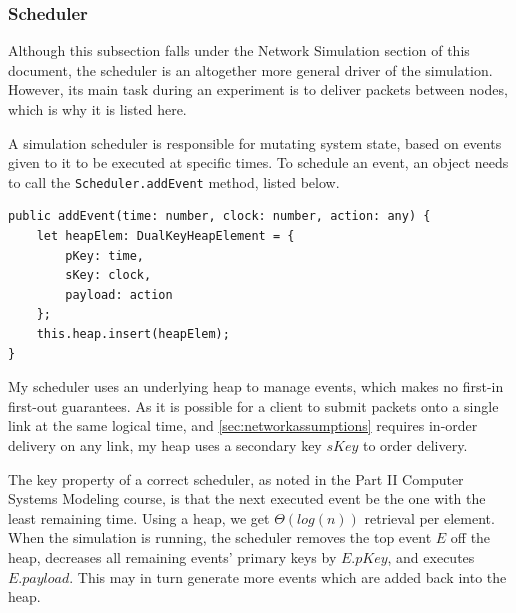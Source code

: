 \documentclass[12pt,a4paper,twoside,openright]{report}
\begin{document}
		
		\subsubsection{Scheduler}
		Although this subsection falls under the Network Simulation section of this document, the scheduler is an altogether more general driver of the simulation. However, its main task during an experiment is to deliver packets between nodes, which is why it is listed here.
		
		A simulation scheduler is responsible for mutating system state, based on events given to it to be executed at specific times. To schedule an event, an object needs to call the \lstinline|Scheduler.addEvent| method, listed below.
\begin{lstlisting}[caption=The Scheduler.addEvent method]
public addEvent(time: number, clock: number, action: any) {
    let heapElem: DualKeyHeapElement = {
        pKey: time,
        sKey: clock,
        payload: action
    };
    this.heap.insert(heapElem);
}
\end{lstlisting}

		My scheduler uses an underlying heap to manage events, which makes no first-in first-out guarantees. As it is possible for a client to submit packets onto a single link at the same logical time, and \cref{sec:networkassumptions} requires in-order delivery on any link, my heap uses a secondary key $sKey$ to order delivery.
		
		The key property of a correct scheduler, as noted in the Part II Computer Systems Modeling \cite[slide 120]{compsysmodeling} course, is that the next executed event be the one with the least remaining time. Using a heap, we get $\Theta (log(n))$ retrieval per element. When the simulation is running, the scheduler removes the top event $E$ off the heap, decreases all remaining events' primary keys by $E.pKey$, and executes $E.payload$. This may in turn generate more events which are added back into the heap.
		
\end{document}
